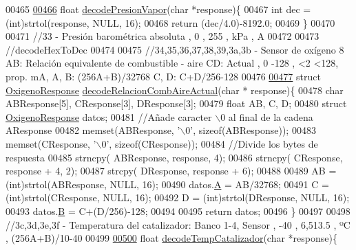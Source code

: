 \begin{DoxyCode}
{{{{{{{00465 
\hyperlink{decoders_8hpp_ab86bda1fcefda784e048796e2d892475}{00466} \textcolor{keywordtype}{float} \hyperlink{decoders_8cpp_ab86bda1fcefda784e048796e2d892475}{decodePresionVapor}(\textcolor{keywordtype}{char} *response)\{
00467     \textcolor{keywordtype}{int} dec = (int)strtol(response, NULL, 16);
00468     \textcolor{keywordflow}{return} (dec/4.0)-8192.0;
00469 \}
00470 
00471 \textcolor{comment}{//33 - Presión barométrica absoluta , 0 , 255 , kPa , A}
00472 
00473 \textcolor{comment}{//decodeHexToDec}
00474 
00475 \textcolor{comment}{//34,35,36,37,38,39,3a,3b - Sensor de oxígeno 8 AB: Relación equivalente de combustible - aire CD: Actual ,
       0 -128 , <2 <128, prop. mA, A, B: (256A+B)/32768 C, D: C+D/256-128 }
00476 
\hyperlink{decoders_8hpp_a4cedb500095b25b3d4fff382094b0eb9}{00477} \textcolor{keyword}{struct }\hyperlink{structOxigenoResponse}{OxigenoResponse} \hyperlink{decoders_8cpp_a4cedb500095b25b3d4fff382094b0eb9}{decodeRelacionCombAireActual}(char *
      response)\{
00478     \textcolor{keywordtype}{char} ABResponse[5], CResponse[3], DResponse[3];
00479     \textcolor{keywordtype}{float} AB, C, D;
00480     \textcolor{keyword}{struct }\hyperlink{structOxigenoResponse}{OxigenoResponse} datos; 
00481     \textcolor{comment}{//Añade caracter \(\backslash\)0 al final de la cadena AResponse}
00482     memset(ABResponse, \textcolor{charliteral}{'\(\backslash\)0'}, \textcolor{keyword}{sizeof}(ABResponse));
00483     memset(CResponse, \textcolor{charliteral}{'\(\backslash\)0'}, \textcolor{keyword}{sizeof}(CResponse));
00484     \textcolor{comment}{//Divide los bytes de respuesta}
00485     strncpy( ABResponse, response, 4);
00486     strncpy( CResponse, response + 4, 2);
00487     strcpy( DResponse, response + 6);
00488 
00489     AB = (int)strtol(ABResponse, NULL, 16);
00490     datos.\hyperlink{structOxigenoResponse_a068c403e5746226cf22bb020b4c786d3}{A} = AB/32768;
00491     C = (int)strtol(CResponse, NULL, 16);
00492     D = (int)strtol(DResponse, NULL, 16);
00493     datos.\hyperlink{structOxigenoResponse_a96b19152dd001e19d1351e2d97f22736}{B} = C+(D/256)-128; 
00494     
00495     \textcolor{keywordflow}{return} datos;
00496 \}
00497 
00498 \textcolor{comment}{//3c,3d,3e,3f - Temperatura del catalizador: Banco 1-4, Sensor , -40 , 6,513.5 , ºC , (256A+B)/10-40 }
00499 
\hyperlink{decoders_8hpp_a8251853ca2e5b8b2e88c75f50d53bc8d}{00500} \textcolor{keywordtype}{float} \hyperlink{decoders_8cpp_a8251853ca2e5b8b2e88c75f50d53bc8d}{decodeTempCatalizador}(\textcolor{keywordtype}{char} *response)\{
}}}}}}}
\end{DoxyCode}
